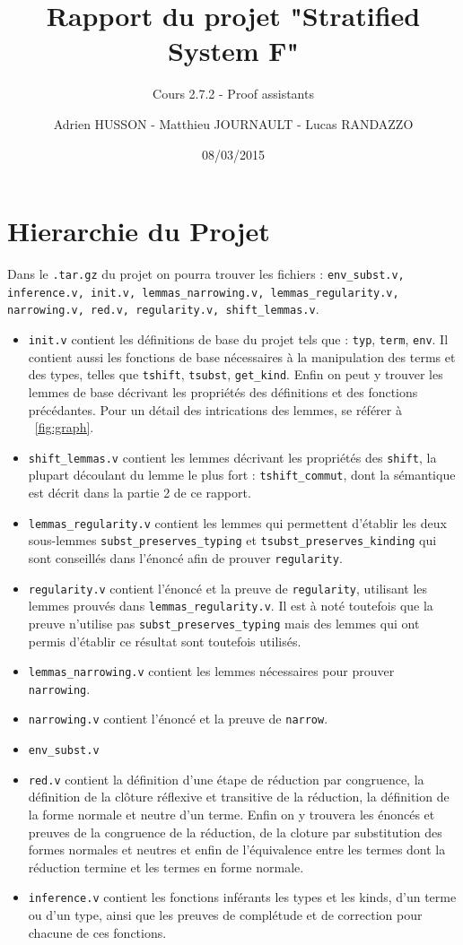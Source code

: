 \documentclass[a4paper,10pt]{scrartcl}
\title{Rapport du projet "Stratified System F"}
\subtitle{Cours 2.7.2 - Proof assistants}
\author{Adrien HUSSON - Matthieu JOURNAULT - Lucas RANDAZZO}
\date{08/03/2015}
\begin{document}
     \maketitle
     \tableofcontents
     \section{Hierarchie du Projet}
     Dans le \texttt{.tar.gz} du projet on pourra trouver les fichiers : \texttt{env\_subst.v, inference.v, init.v, lemmas\_narrowing.v, lemmas\_regularity.v, narrowing.v, red.v, regularity.v, shift\_lemmas.v}. 
     \begin{itemize}
      \item \texttt{init.v} contient les définitions de base du projet tels que : \texttt{typ}, \texttt{term}, \texttt{env}. Il contient aussi les fonctions de base nécessaires à la manipulation des terms et des types, telles que \texttt{tshift}, \texttt{tsubst}, \texttt{get\_kind}. Enfin on peut y trouver les lemmes de base décrivant les propriétés des définitions et des fonctions précédantes. Pour un détail des intrications des lemmes, se référer à ~\ref{fig:graph}.
      \item \texttt{shift\_lemmas.v} contient les lemmes décrivant les propriétés des \texttt{shift}, la plupart découlant du lemme le plus fort : \texttt{tshift\_commut}, dont la sémantique est décrit dans la partie 2 de ce rapport.
      \item \texttt{lemmas\_regularity.v} contient les lemmes qui permettent d'établir les deux sous-lemmes \texttt{subst\_preserves\_typing} et \texttt{tsubst\_preserves\_kinding} qui sont conseillés dans l'énoncé afin de prouver \texttt{regularity}.
      \item \texttt{regularity.v} contient l'énoncé et la preuve de \texttt{regularity}, utilisant les lemmes prouvés dans \texttt{lemmas\_regularity.v}. Il est à noté toutefois que la preuve n'utilise pas \texttt{subst\_preserves\_typing} mais des lemmes qui ont permis d'établir ce résultat sont toutefois utilisés.
      \item \texttt{lemmas\_narrowing.v} contient les lemmes nécessaires pour prouver \texttt{narrowing}.
      \item \texttt{narrowing.v} contient l'énoncé et la preuve de \texttt{narrow}.
      \item \texttt{env\_subst.v}
      \item \texttt{red.v} contient la définition d'une étape de réduction par congruence, la définition de la clôture réflexive et transitive de la réduction, la définition de la forme normale et neutre d'un terme. Enfin on y trouvera les énoncés et preuves de la congruence de la réduction, de la cloture par substitution des formes normales et neutres et enfin de l'équivalence entre les termes dont la réduction termine et les termes en forme normale.
      \item \texttt{inference.v} contient les fonctions inférants les types et les kinds, d'un terme ou d'un type, ainsi que les preuves de complétude et de correction pour chacune de ces fonctions.
     \end{itemize}
\end{document}
